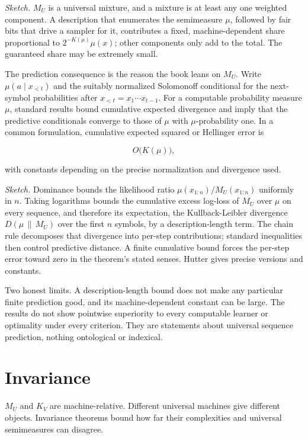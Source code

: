 \emph{Sketch.} $M_U$ is a universal mixture, and a mixture is at least any one weighted component. A description that enumerates the semimeasure $\mu$, followed by fair bits that drive a sampler for it, contributes a fixed, machine-dependent share proportional to $2^{-K(\mu)}\mu(x)$; other components only add to the total. The guaranteed share may be extremely small.

The prediction consequence is the reason the book leans on $M_U$. Write $\mu(a \mid x_{<t})$ and the suitably normalized Solomonoff conditional for the next-symbol probabilities after $x_{<t}=x_1\cdots x_{t-1}$. For a computable probability measure $\mu$, standard results bound cumulative expected divergence and imply that the predictive conditionals converge to those of $\mu$ with $\mu$-probability one. In a common formulation, cumulative expected squared or Hellinger error is

$$O\!\big(K(\mu)\big),$$

with constants depending on the precise normalization and divergence used.

\emph{Sketch.} Dominance bounds the likelihood ratio $\mu(x_{1:n})/M_U(x_{1:n})$ uniformly in $n$. Taking logarithms bounds the cumulative excess log-loss of $M_U$ over $\mu$ on every sequence, and therefore its expectation, the Kullback-Leibler divergence $D(\mu \,\|\, M_U)$ over the first $n$ symbols, by a description-length term. The chain rule decomposes that divergence into per-step contributions; standard inequalities then control predictive distance. A finite cumulative bound forces the per-step error toward zero in the theorem's stated senses. Hutter gives precise versions and constants.

Two honest limits. A description-length bound does not make any particular finite prediction good, and its machine-dependent constant can be large. The results do not show pointwise superiority to every computable learner or optimality under every criterion. They are statements about universal sequence prediction, nothing ontological or indexical.

\section*{Invariance}

$M_U$ and $K_V$ are machine-relative. Different universal machines give different objects. Invariance theorems bound how far their complexities and universal semimeasures can disagree.

